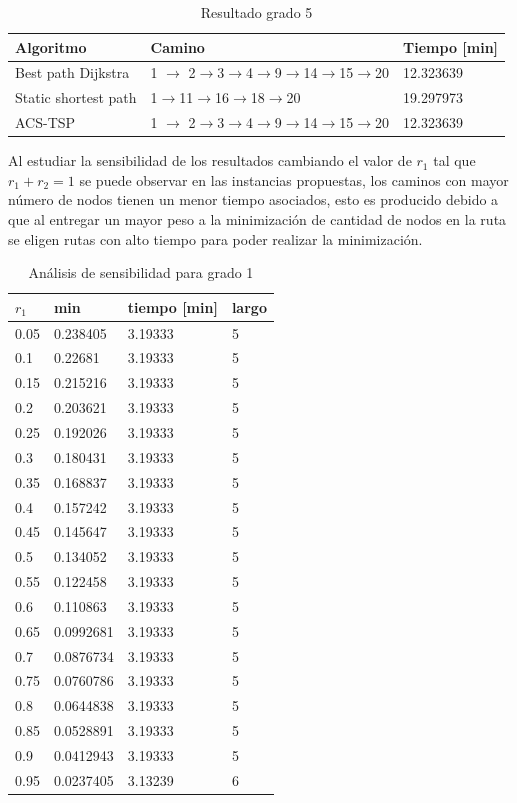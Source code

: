 \documentclass[letter, 10pt]{article}
\begin{document}
\begin{table}[H]
\centering
\begin{tabular}{|l|l|l|}
\hline
Algoritmo            & Camino           & Tiempo {[}min{]} \\ \hline
Best path Dijkstra   & 1 $\rightarrow$ 2$\rightarrow$3$\rightarrow$4$\rightarrow$9$\rightarrow$14$\rightarrow$15$\rightarrow$20 & 12.323639         \\ \hline
Static shortest path & 1$\rightarrow$11$\rightarrow$16$\rightarrow$18$\rightarrow$20    & 19.297973         \\ \hline
ACS-TSP              & 1 $\rightarrow$ 2$\rightarrow$3$\rightarrow$4$\rightarrow$9$\rightarrow$14$\rightarrow$15$\rightarrow$20 & 12.323639         \\ \hline
\end{tabular}
\caption{Resultado grado 5}
\label{res-grade-5}
\end{table}

Al estudiar la sensibilidad de los resultados cambiando el valor de $r_1$ tal que $r_1 + r_2 = 1$ se puede observar en las instancias propuestas, los caminos con mayor número de nodos tienen un menor tiempo asociados, esto es producido debido a que al entregar un mayor peso a la minimización de cantidad de nodos en la ruta se eligen rutas con alto tiempo para poder realizar la minimización.
\begin{table}[H]
\centering
\begin{tabular}{|l|l|l|l|}
\hline
$r_1$ & min & tiempo {[}min{]} & largo \\ \hline
0.05 & 0.238405  & 3.19333 & 5 \\ \hline
0.1  & 0.22681   & 3.19333 & 5 \\ \hline
0.15 & 0.215216  & 3.19333 & 5 \\ \hline
0.2  & 0.203621  & 3.19333 & 5 \\ \hline
0.25 & 0.192026  & 3.19333 & 5 \\\hline
0.3  & 0.180431  & 3.19333 & 5 \\\hline
0.35 & 0.168837  & 3.19333 & 5 \\\hline
0.4  & 0.157242  & 3.19333 & 5 \\\hline
0.45 & 0.145647  & 3.19333 & 5 \\\hline
0.5  & 0.134052  & 3.19333 & 5 \\\hline
0.55 & 0.122458  & 3.19333 & 5 \\\hline
0.6  & 0.110863  & 3.19333 & 5 \\\hline
0.65 & 0.0992681 & 3.19333 & 5 \\\hline
0.7  & 0.0876734 & 3.19333 & 5 \\\hline
0.75 & 0.0760786 & 3.19333 & 5 \\\hline
0.8  & 0.0644838 & 3.19333 & 5 \\\hline
0.85 & 0.0528891 & 3.19333 & 5 \\\hline
0.9  & 0.0412943 & 3.19333 & 5 \\\hline
0.95 & 0.0237405 & 3.13239 & 6 \\\hline
\end{tabular}
\caption{Análisis de sensibilidad para grado 1}
\label{ses-1}
\end{table}
\end{document}
